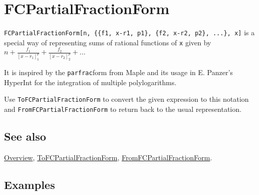 \documentclass[../FeynCalcManual.tex]{subfiles}
\begin{document}
\begin{Shaded}
\begin{Highlighting}[]
 
\end{Highlighting}
\end{Shaded}

\hypertarget{fcpartialfractionform}{
\section{FCPartialFractionForm}\label{fcpartialfractionform}}

\texttt{FCPartialFractionForm[\allowbreak{}n,\ \allowbreak{}\{\allowbreak{}\{\allowbreak{}f1,\ \allowbreak{}x-r1,\ \allowbreak{}p1\},\ \allowbreak{}\{\allowbreak{}f2,\ \allowbreak{}x-r2,\ \allowbreak{}p2\},\ \allowbreak{}...\},\ \allowbreak{}x]}
is a special way of representing sums of rational functions of
\texttt{x} given by
\(n + \frac{f_1}{[x-r_1]^p_1} + \frac{f_2}{[x-r_2]^p_2} + \ldots\)

It is inspired by the \texttt{parfrac}form from Maple and its usage in
E. Panzer's HyperInt for the integration of multiple polylogarithms.

Use \texttt{ToFCPartialFractionForm} to convert the given expression to
this notation and \texttt{FromFCPartialFractionForm} to return back to
the usual representation.

\subsection{See also}

\hyperlink{toc}{Overview},
\hyperlink{tofcpartialfractionform}{ToFCPartialFractionForm},
\hyperlink{fromfcpartialfractionform}{FromFCPartialFractionForm}.

\subsection{Examples}

\begin{Shaded}
\begin{Highlighting}[]
\OperatorTok{[} \SpecialCharTok{+} \SpecialCharTok{\^{}}\SpecialCharTok{/}\NormalTok{(} \SpecialCharTok{{-}} \NormalTok{)}\OperatorTok{,} \OperatorTok{]}
\end{Highlighting}
\end{Shaded}
\end{document}

